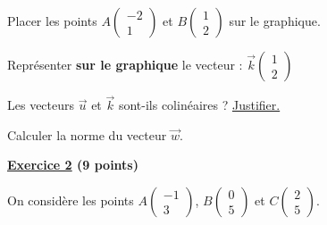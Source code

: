 \documentclass[12pt,a4paper]{exam}
\newcommand*{\Coord}[2]{%
  \ensuremath{
    \begin{pmatrix} 
      #1\\[5pt]
      #2 
    \end{pmatrix}}}
\begin{document}
\vspace{5pt}
\begin{questions}

\question[0,5] Placer les points $A\Coord{-2}{1}$ et $B\Coord{1}{2}$ sur le graphique.

\vspace{10pt}

\question
{}

\question[1] Représenter \textbf{sur le graphique} le vecteur : $\overrightarrow{k}\Coord{1}{2}$

\question[2] Les vecteurs $\overrightarrow{u}$ et $\overrightarrow{k}$ sont-ils colinéaires ? 
\underline{Justifier.}

\question[1] Calculer la norme du vecteur $\overrightarrow{w}$.



\end{questions}

\vspace{1cm}


\textbf{\underline{Exercice 2} (9 points)}

On considère les points $A\Coord{-1}{3}$, $B\Coord{0}{5}$ et $C\Coord{2}{5}$.
\end{document}
